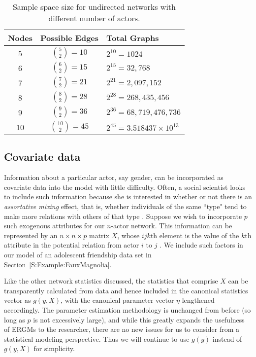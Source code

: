 \begin{table}[h!] 
\caption{Sample space size for undirected networks with different number of 
actors.}

\begin{tabular}{ccl} 
\hline 
Nodes & Possible Edges & Total Graphs \\ [1ex]
\hline
5 & ${5 \choose 2} = 10$ & $2^{10} = 1024$ \\ [1ex]
6 & ${6 \choose 2} = 15$ & $2^{15} = 32,768$ \\ [1ex]
7 & ${7 \choose 2} = 21$ & $2^{21} = 2,097,152$ \\ [1ex]
8 & ${8 \choose 2} = 28$ & $2^{28} = 268,435,456$ \\ [1ex]
9 & ${9 \choose 2} = 36$ & $2^{36} = 68,719,476,736$ \\ [1ex]
10 & ${10 \choose 2} = 45$ & $2^{45} = 3.518437\times10^{13}$ \\ [1ex]
\hline 
\end{tabular} \label{T:number graphs}
\end{table}

\subsection{Covariate data} \label{S:Covariate}
Information about a particular actor, say gender, can be incorporated as 
covariate data into the model with little difficulty.
Often, a social scientist looks to include such information because she is interested in
whether or not there is an \emph{assortative mixing} effect, that is, whether individuals of the same ``type" tend to make more relations with others of that type \citep{Goodreau:2009}.  
Suppose we wish to incorporate $p$ such exogenous attributes for our $n$-actor network.  
This information can be represented by an $n \times n \times p$ matrix $X$, whose 
$ijk$th element is the value of the $k$th attribute in the potential relation from actor
$i$ to $j$ \citep*{Fienberg:1981,ergm}.  We include such factors in our model 
of an adolescent friendship data set in Section~\ref{S:Example:FauxMagnolia}.

Like the other network statistics discussed, the statistics that comprise $X$ can 
be transparently calculated from data and hence included in the canonical 
statistics vector as $g(y, X)$,
with the canonical parameter vector $\eta$ lengthened accordingly.
The parameter estimation methodology is unchanged from before (so long as $p$ is not
excessively large), and while this greatly expands the
usefulness of ERGMs to the researcher, there are no new issues for us to consider
from a statistical modeling perspective.
Thus we will continue to use $g(y)$ instead of $g(y,X)$ for simplicity.  



